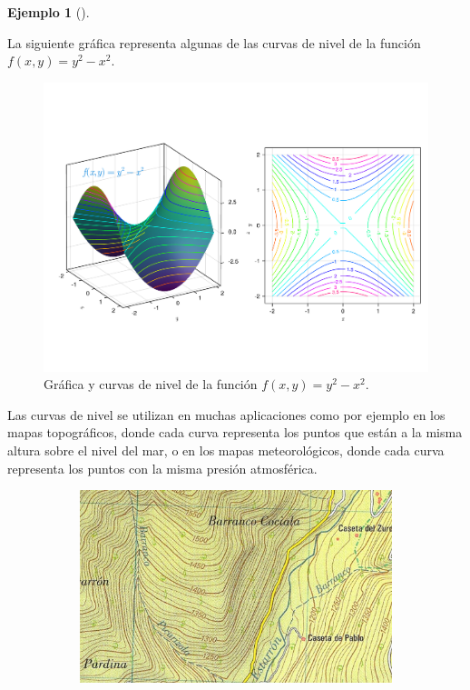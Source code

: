 \documentclass[
  a4paper,
]{scrreport}
\theoremstyle{definition}
\newtheorem{example}{Ejemplo}[chapter]
\theoremstyle{plain}
\theoremstyle{definition}
\theoremstyle{definition}
\theoremstyle{plain}
\theoremstyle{plain}
\theoremstyle{remark}
\begin{document}
\begin{example}[]\protect\hypertarget{exm-curvas-nivel}{}\label{exm-curvas-nivel}

La siguiente gráfica representa algunas de las curvas de nivel de la
función \(f(x,y) = y^2-x^2\).

\begin{figure}[H]

{\centering \includegraphics{./img/derivadas-funciones-varias-variables/curvas-nivel.pdf}

}

\caption{Gráfica y curvas de nivel de la función \(f(x,y) = y^2-x^2\).}

\end{figure}%

Las curvas de nivel se utilizan en muchas aplicaciones como por ejemplo
en los mapas topográficos, donde cada curva representa los puntos que
están a la misma altura sobre el nivel del mar, o en los mapas
meteorológicos, donde cada curva representa los puntos con la misma
presión atmosférica.

\begin{figure}

\begin{minipage}{0.50\linewidth}

\begin{figure}[H]

{\centering \includegraphics{./img/derivadas-funciones-varias-variables/mapa-topografico.jpg}

}
\end{figure}
\end{minipage}
\end{figure}
\end{example}
\end{document}
